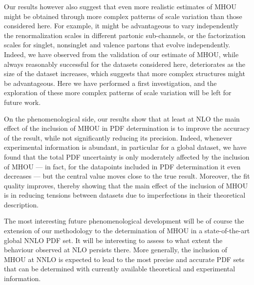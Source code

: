 Our results however also suggest that even more realistic estimates of
MHOU might be obtained through more complex patterns of scale variation 
than those considered here.
%
For example, it might be advantageous to vary 
independently the renormalization scales in different partonic
sub-channels, or the factorization scales for singlet, nonsinglet and 
valence partons that evolve independently.
%
Indeed, we have observed from the validation of our
estimate of MHOU, while always reasonably successful for the datasets
considered here, deteriorates as the size of the dataset increases,
which suggests that more complex structures  might be advantageous.
%
Here we have performed a first investigation, and the
exploration of these more complex patterns of scale variation will be 
left for future work.

On the phenomenological side, our results show that at least at NLO the
main effect of the inclusion of MHOU in PDF determination is to
improve the accuracy of the result, while not significantly reducing
its precision.
%
Indeed, whenever experimental information is abundant,
in particular for a global dataset, we have found that the
total PDF uncertainty is only moderately affected by the inclusion 
of MHOU --- in fact, for the datapoints included in PDF determination 
it even decreases --- but the central value moves close to the true
result.
%
Moreover, the fit quality improves, thereby showing that the main effect 
of the inclusion of MHOU is in reducing tensions between datasets due to 
imperfections in their theoretical description.

The most interesting future phenomenological development will be of
course the extension of our methodology to the determination of MHOU
in a state-of-the-art global NNLO PDF set.
%
It will be interesting to
assess to what extent the behaviour observed at NLO persists there.
%
More generally, the inclusion of MHOU at NNLO is expected to lead to 
the most precise and accurate PDF sets that can be determined with 
currently available theoretical and experimental information.













